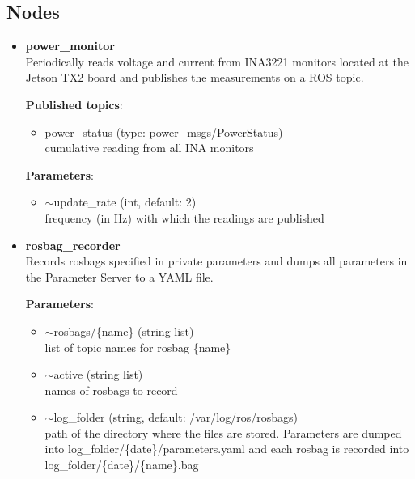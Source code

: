 \documentclass[english,inz,shortabstract]{iithesis}
\newcommand{\val}[1]{\textbf{\textsf{#1}}}
\begin{document}
	\subsection{Nodes}
		\begin{itemize}
			\item \val{power\_monitor}\\
			Periodically reads voltage and current from INA3221 monitors located at the Jetson TX2 board and publishes the measurements on a ROS topic.

			\textbf{Published topics}:
			\begin{itemize}[itemsep=0pt, parsep=2pt, topsep=0pt]
				\item \textsf{power\_status} (type: \textsf{power\_msgs/PowerStatus})\\
				cumulative reading from all INA monitors
			\end{itemize}

			\textbf{Parameters}:
			\begin{itemize}[itemsep=0pt, parsep=2pt, topsep=0pt]
				\item \textsf{$\sim$update\_rate} (\textsf{int}, default: \textsf{2})\\
				frequency (in Hz) with which the readings are published
			\end{itemize}

			\item \val{rosbag\_recorder}\\
			Records rosbags specified in private parameters and dumps all parameters in the Parameter Server to a YAML file.

			\textbf{Parameters}:
			\begin{itemize}[itemsep=0pt, parsep=2pt, topsep=0pt]
				\item \textsf{$\sim$rosbags/\{name\}} (\textsf{string list})\\
				list of topic names for rosbag \{name\}
				\item \textsf{$\sim$active} (\textsf{string list})\\
				names of rosbags to record
				\item \textsf{$\sim$log\_folder} (\textsf{string}, default: \textsf{/var/log/ros/rosbags})\\
				path of the directory where the files are stored. Parameters are dumped into \textsf{log\_folder/\{date\}/parameters.yaml} and each rosbag is recorded into \textsf{log\_folder/\{date\}/\{name\}.bag}
			\end{itemize}
		\end{itemize}
\end{document}

